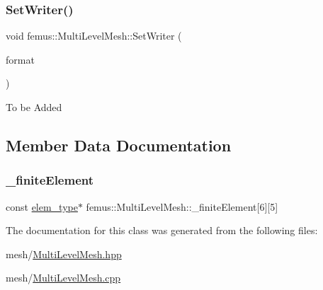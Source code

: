 \subsubsection{\texorpdfstring{Set\+Writer()}{SetWriter()}}
{\footnotesize\ttfamily void femus\+::\+Multi\+Level\+Mesh\+::\+Set\+Writer (\begin{DoxyParamCaption}\item[{const \mbox{\hyperlink{_writer_enum_8hpp_a18b827c3c1f62b8a57febdcad0c871a8}{Writer\+Enum}}}]{format }\end{DoxyParamCaption})\hspace{0.3cm}{\ttfamily [inline]}}

To be Added 

\subsection{Member Data Documentation}
\mbox{\label{classfemus_1_1_multi_level_mesh_a4ec0caf1cf059019f1b7044c1d733064}} 
\subsubsection{\texorpdfstring{\+\_\+finite\+Element}{\_finiteElement}}
{\footnotesize\ttfamily const \mbox{\hyperlink{classfemus_1_1elem__type}{elem\+\_\+type}}$\ast$ femus\+::\+Multi\+Level\+Mesh\+::\+\_\+finite\+Element\mbox{[}6\mbox{]}\mbox{[}5\mbox{]}}



The documentation for this class was generated from the following files\+:\begin{DoxyCompactItemize}
\item 
mesh/\mbox{\hyperlink{_multi_level_mesh_8hpp}{Multi\+Level\+Mesh.\+hpp}}\item 
mesh/\mbox{\hyperlink{_multi_level_mesh_8cpp}{Multi\+Level\+Mesh.\+cpp}}\end{DoxyCompactItemize}
